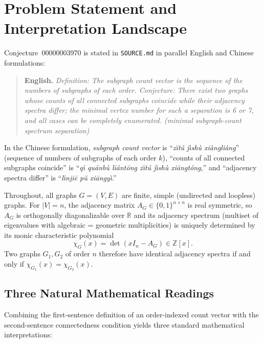 \documentclass[11pt]{article}
\theoremstyle{definition}
\begin{document}
\section{Problem Statement and Interpretation Landscape}

Conjecture~00000003970 is stated in \texttt{SOURCE.md} in parallel English and Chinese formulations:
\begin{quote}
\textbf{English.} \emph{Definition: The subgraph count vector is the sequence of the numbers of subgraphs of each order. Conjecture: There exist two graphs whose counts of all connected subgraphs coincide while their adjacency spectra differ; the minimal vertex number for such a separation is 6 or 7, and all cases can be completely enumerated. (minimal subgraph-count spectrum separation)}
\end{quote}
In the Chinese formulation, \emph{subgraph count vector} is ``\emph{z\u{\i}t\'u j\`{\i}sh\`u xi\`angli\`ang}'' (sequence of numbers of subgraphs of each order $k$), ``counts of all connected subgraphs coincide'' is ``\emph{q\'{\i} qu\'anb\`u li\'ant\=ong z\u{\i}t\'u j\`{\i}sh\`u xi\=angt\'ong},'' and ``adjacency spectra differ'' is ``\emph{l\'{\i}nji\=e p\u{u} xi\=angy\`{\i}}.''

Throughout, all graphs $G = (V, E)$ are finite, simple (undirected and loopless) graphs. For $|V| = n$, the adjacency matrix $A_G \in \{0,1\}^{n \times n}$ is real symmetric, so $A_G$ is orthogonally diagonalizable over $\mathbb{R}$ and its adjacency spectrum (multiset of eigenvalues with algebraic = geometric multiplicities) is uniquely determined by its monic characteristic polynomial
\[
  \chi_G(x) = \det(xI_n - A_G) \in \mathbb{Z}[x].
\]
Two graphs $G_1, G_2$ of order $n$ therefore have identical adjacency spectra if and only if $\chi_{G_1}(x) = \chi_{G_2}(x)$.

\subsection{Three Natural Mathematical Readings}

Combining the first-sentence definition of an order-indexed count vector with the second-sentence connectedness condition yields three standard mathematical interpretations:
\end{document}
